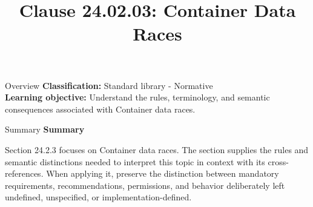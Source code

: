 \documentclass[10pt,letterpaper]{article}
\title{Clause 24.02.03: Container Data Races}
\author{}
\date{}
\begin{document}
\maketitle
\begin{CornellOverviewBox}{Overview}
\textbf{Classification:} Standard library - Normative\\[2pt]
\textbf{Learning objective:} Understand the rules, terminology, and semantic consequences associated with Container data races.
\end{CornellOverviewBox}\begin{CornellSummaryBox}{Summary}
{\sffamily\bfseries\color{Accent} Summary}\par\vspace{3pt}Section 24.2.3 focuses on Container data races. The section supplies the rules and semantic distinctions needed to interpret this topic in context with its cross-references. When applying it, preserve the distinction between mandatory requirements, recommendations, permissions, and behavior deliberately left undefined, unspecified, or implementation-defined.
\end{CornellSummaryBox}
\end{document}
